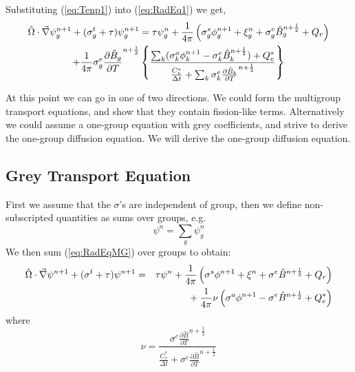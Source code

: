\documentclass[12pt]{article}
\newcommand{\dt}{\ensuremath{\Delta t}}
\newcommand{\Cvs}{\ensuremath{C_{v}^{*}}}
\newcommand{\Bnphlf}{\ensuremath{\hat{B}^{n+\frac{1}{2}}}}
\newcommand{\pBnphlfdT}{\ensuremath{\frac{\partial\hat{B}}{\partial T}^{n+\frac{1}{2}}}}
\newcommand{\Bgnphlf}{\ensuremath{\hat{B}_{g}^{n+\frac{1}{2}}}}
\newcommand{\pBgnphlfdT}{\ensuremath{\frac{\partial\hat{B}_{g}}{\partial T}^{n+\frac{1}{2}}}}
\newcommand{\Bknphlf}{\ensuremath{\hat{B}_{k}^{n+\frac{1}{2}}}}
\newcommand{\pBknphlfdT}{\ensuremath{\frac{\partial\hat{B}_{k}}{\partial T}^{n+\frac{1}{2}}}}
\begin{document}
Substituting (\ref{eq:Tenp1}) into (\ref{eq:RadEq1}) we get,
\begin{multline}
\hat{\Omega} \cdot \del \psi^{n+1}_{g} + (\sigma^{t}_{g} + \tau) \psi^{n+1}_{g}
        =
         \tau \psi_{g}^{n}
        + \frac{1}{4\pi} \left(
                \sigma^{s}_{g} \phi^{n+1}_{g}
                + \xi_{g}^{n}
                + \sigma^{e}_{g} \Bgnphlf + Q_{r}\right)
        \\
        + \frac{1}{4\pi} \sigma^{e}_{g} \pBgnphlfdT
                \left\{ \frac{\sum_{k} (\sigma_{k}^{a}\phi_{k}^{n+1} 
                                        - \sigma_{k}^{e}\Bknphlf) + Q_{e}^{*}}
                             {\frac{\Cvs}{\dt} + \sum_{k} \sigma_{k}^{e}\pBknphlfdT}
                \right\}
\label{eq:RadEqMG}
\end{multline}

At this point we can go in one of two directions.  We could form the
multigroup transport equations, and show that they contain fission-like terms.
Alternatively we could assume a one-group equation
with grey coefficients, and strive to derive the
one-group diffusion equation.  We will derive the one-group diffusion equation.

\subsection{Grey Transport Equation}

First we assume that the $\sigma$'s are independent of group, then
we define non-subscripted quantities as sums over groups, e.g.
\begin{equation}
        \psi^{n} = \sum_{g} \psi_{g}^{n}
\end{equation}
We then sum (\ref{eq:RadEqMG}) over groups to obtain:
\begin{eqnarray}
\hat{\Omega} \cdot \del \psi^{n+1} + (\sigma^{t} + \tau) \psi^{n+1}
        &=& \tau \psi^{n}
        + \frac{1}{4\pi} \left( \sigma^{s} \phi^{n+1}
                        + \xi^{n}
                        + \sigma^{e} \Bnphlf + Q_{r} \right)
        \nonumber \\
        & & \mbox{}
        + \frac{1}{4\pi} \nu \left( \sigma^{a}\phi^{n+1}
                                        - \sigma^{e}\Bnphlf + Q_{e}^{*}\right)
\label{eq:RadEqGrey}
\end{eqnarray}
where
\begin{equation}
        \nu = \frac{\sigma^{e} \pBnphlfdT } {\frac{\Cvs}{\dt}
                                             + \sigma^{e}\pBnphlfdT}
\end{equation}
\end{document}
